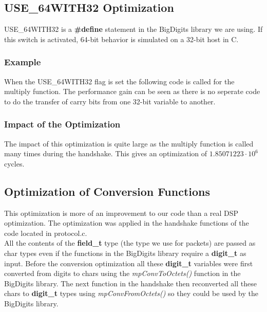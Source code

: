 \documentclass[a4paper]{article}
\begin{document}
\subsection{USE\_64WITH32 Optimization}

USE\_64WITH32 is a \textbf{\#define} statement in the BigDigits library we are using. If this switch is activated, 64-bit behavior is simulated on a 32-bit host in C.

\subsubsection{Example}

When the USE\_64WITH32 flag is set the following code is called for the multiply function. The performance gain can be seen as there is no seperate code to do the transfer of carry bits from one 32-bit variable to another.



\subsubsection{Impact of the Optimization}

The impact of this optimization is quite large as the multiply function is called many times during the handshake. This gives an optimization of $1.85071223 \cdot 10^{6}$ cycles.

\subsection{Optimization of Conversion Functions}

This optimization is more of an improvement to our code than a real DSP optimization. The optimization was applied in the handshake functions of the code located in protocol.c.\\

All the contents of the \textbf{field\_t} type (the type we use for packets) are passed as char types even if the functions in the BigDigits library require a \textbf{digit\_t} as input. Before the conversion optimization all these \textbf{digit\_t} variables were first converted from digits to chars using the \textit{mpConvToOctets()} function in the BigDigits library. The next function in the handshake then reconverted all these chars to \textbf{digit\_t} types using \textit{mpConvFromOctets()} so they could be used by the BigDigits library.\\
\end{document}
